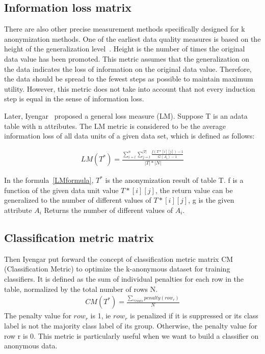 \documentclass[journal,transmag]{IEEEtran}
\begin{document}
\subsection{Information loss matrix}
There are also other precise measurement methods specifically designed for k anonymization methods. One of the earliest data quality measures is based on the height of the generalization level~\cite{samarati2001protecting}. Height is the number of times the original data value has been promoted. This metric assumes that the generalization on the data indicates the loss of information on the original data value. Therefore, the data should be spread to the fewest steps as possible to maintain maximum utility. However, this metric does not take into account that not every induction step is equal in the sense of information loss.

Later, Iyengar~\cite{iyengar2002transforming} proposed a general loss measure (LM). Suppose T is an adata table with n attributes. The LM metric is considered to be the average information loss of all data units of a given data set, which is defined as follows:

\begin{eqnarray}\label{LMformula}
LM(T^*)=\frac{\sum^{n}_{i=l} \sum^{|T|}_{j=l} \frac{f(T*[i][j])-1}{G(A_i)-1} }{|T|*|N|}
\end{eqnarray}

In the formula~\ref{LMformula}, $T^*$ is the anonymization result of table T. f is a function of the given data unit value $ T * [i] [j] $, the return value can be generalized to the number of different values of $ T * [i] [j] $, g is the given attribute $ A_i $ Returns the number of different values of $ A_i $.

\subsection{Classification metric matrix}
Then Iyengar put forward the concept of classification metric matrix CM (Classification Metric) to optimize the k-anonymous dataset for training classifiers. It is defined as the sum of individual penalties for each row in the table, normalized by the total number of rows N.
\begin{eqnarray}\label{CMformula}
CM(T^*)=\frac{\sum_{\forall rows} penalty(row_r) }{N}
\end{eqnarray}
The penalty value for $row_r$ is 1, ie $row_r$ is penalized if it is suppressed or its class label is not the majority class label of its group. Otherwise, the penalty value for row r is 0. This metric is particularly useful when we want to build a classifier on anonymous data.
\end{document}
